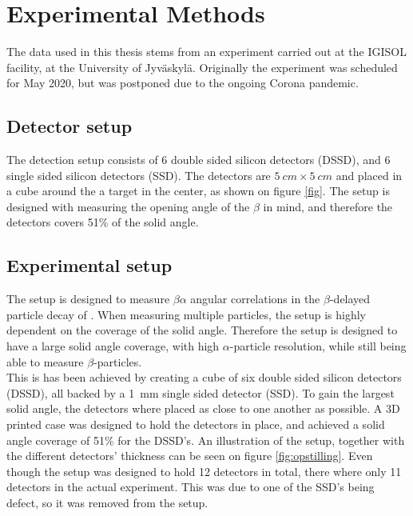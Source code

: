 \chapter{Experimental Methods}
The data used in this thesis stems from an experiment carried out at the IGISOL facility, at the University of Jyväskylä. Originally the experiment was scheduled for May 2020, but was postponed due to the ongoing Corona pandemic. 


\section{Detector setup}
The detection setup consists of 6 double sided silicon detectors (DSSD), and 6 single sided silicon detectors (SSD). 
The detectors are $\SI{5}{cm} \times \SI{5}{cm}$ and placed in a cube around the a target in the center, as shown on figure \ref{fig}. The setup is designed with measuring the opening angle of the $\beta$ in mind, and therefore the detectors covers 51\% of the solid angle. \\
 

\section{Experimental setup}
The setup is designed to measure $\beta\alpha$ angular correlations in the $\beta$-delayed particle decay of . When measuring multiple particles, the setup is highly dependent on the coverage of the solid angle. Therefore the setup is designed to have a large solid angle coverage, with high $\alpha$-particle resolution, while still being able to measure $\beta$-particles. \\
This is has been achieved by creating a cube of six double sided silicon detectors (DSSD), all backed by a \SI{1}{mm} single sided detector (SSD). To gain the largest solid angle, the detectors where placed as close to one another as possible. A 3D printed case was designed to hold the detectors in place, and achieved a solid angle coverage of 51\% for the DSSD's. An illustration of the setup, together with the different detectors' thickness can be seen on figure \ref{fig:opstilling}. 
Even though the setup was designed to hold 12 detectors in total, there where only 11 detectors in the actual experiment. This was due to one of the SSD's being defect, so it was removed from the setup. 

